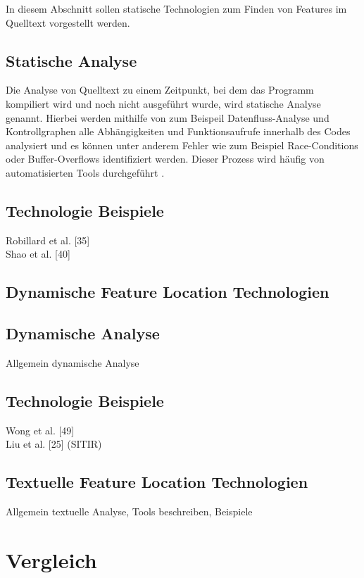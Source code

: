 \documentclass[runningheads,a4paper]{llncs}
\begin{document}
In diesem Abschnitt sollen statische Technologien zum Finden von Features im Quelltext vorgestellt werden.

\subsection*{Statische Analyse}

Die Analyse von Quelltext zu einem Zeitpunkt, bei dem das Programm kompiliert wird und noch nicht ausgeführt wurde, wird statische Analyse genannt. Hierbei werden mithilfe von zum Beispeil Datenfluss-Analyse und Kontrollgraphen alle Abhängigkeiten und Funktionsaufrufe innerhalb des Codes analysiert und es können unter anderem Fehler wie zum Beispiel Race-Conditions oder Buffer-Overflows identifiziert werden. Dieser Prozess wird häufig von automatisierten Tools durchgeführt \cite{static}.

\subsection*{Technologie Beispiele}

Robillard et al. [35]\\
Shao et al. [40]

\subsection{Dynamische Feature Location Technologien}

\subsection*{Dynamische Analyse}
Allgemein dynamische Analyse

\subsection*{Technologie Beispiele}
Wong et al. [49]\\
Liu et al. [25] (SITIR)

\subsection{Textuelle Feature Location Technologien}
Allgemein textuelle Analyse, Tools beschreiben, Beispiele

\section{Vergleich}
\end{document}
